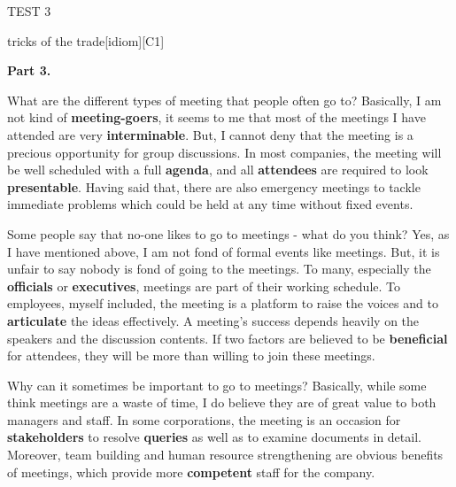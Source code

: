 \begin{glossarymc}[Cambridge 8]
\begin{test}{TEST 3}
\begin{VocabExplain}[Part 2]
            \begin{ExplainCard}{tricks of the trade}[idiom][C1]
            \end{ExplainCard}
        \end{VocabExplain}

    \noindent
    \textbf{Part 3.}
    \begin{qa}{What are the different types of meeting that people often go to?}
    Basically, I am not kind of \textbf{meeting-goers}, it seems to me that most of the meetings I have attended are very \textbf{interminable}. But, I cannot deny that the meeting is a precious opportunity for group discussions. In most companies, the meeting will be well scheduled with a full \textbf{agenda}, and all \textbf{attendees} are required to look \textbf{presentable}. Having said that, there are also emergency meetings to tackle immediate problems which could be held at any time without fixed events.
    \end{qa}

    \begin{qa}{Some people say that no-one likes to go to meetings - what do you think?}
    Yes, as I have mentioned above, I am not fond of formal events like meetings. But, it is unfair to say nobody is fond of going to the meetings. To many, especially the \textbf{officials} or \textbf{executives}, meetings are part of their working schedule. To employees, myself included, the meeting is a platform to raise the voices and to \textbf{articulate} the ideas effectively. A meeting’s success depends heavily on the speakers and the discussion contents. If two factors are believed to be \textbf{beneficial} for attendees, they will be more than willing to join these meetings.
    \end{qa}

    \begin{qa}{Why can it sometimes be important to go to meetings?}
    Basically, while some think meetings are a waste of time, I do believe they are of great value to both managers and staff. In some corporations, the meeting is an occasion for \textbf{stakeholders} to resolve \textbf{queries} as well as to examine documents in detail. Moreover, team building and human resource strengthening are obvious benefits of meetings, which provide more \textbf{competent} staff for the company.
    \end{qa}


\end{test}
\end{glossarymc}
